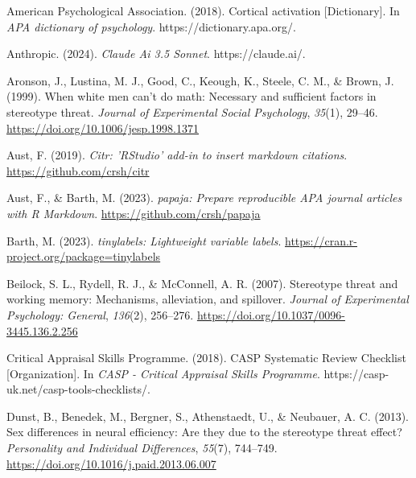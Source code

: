 \documentclass[
  stu]{apa7}
\newlength{\cslhangindent}
\newenvironment{CSLReferences}[2] %
 {\begin{list}{}{%
  \setlength{\itemindent}{0pt}
  \setlength{\leftmargin}{0pt}
  \setlength{\parsep}{0pt}
  \ifodd #1
   \setlength{\leftmargin}{\cslhangindent}
   \setlength{\itemindent}{-1\cslhangindent}
  \fi
  \setlength{\itemsep}{#2\baselineskip}}}
 {\end{list}}
\begin{document}
\label{refs}
\begin{CSLReferences}{1}{0}
American Psychological Association. (2018). Cortical activation {[}Dictionary{]}. In \emph{APA dictionary of psychology}. https://dictionary.apa.org/.

Anthropic. (2024). \emph{Claude {Ai} 3.5 {Sonnet}}. https://claude.ai/.

Aronson, J., Lustina, M. J., Good, C., Keough, K., Steele, C. M., \& Brown, J. (1999). When white men can't do math: {Necessary} and sufficient factors in stereotype threat. \emph{Journal of Experimental Social Psychology}, \emph{35}(1), 29--46. \url{https://doi.org/10.1006/jesp.1998.1371}

Aust, F. (2019). \emph{Citr: 'RStudio' add-in to insert markdown citations}. \url{https://github.com/crsh/citr}

Aust, F., \& Barth, M. (2023). \emph{{papaja}: {Prepare} reproducible {APA} journal articles with {R Markdown}}. \url{https://github.com/crsh/papaja}

Barth, M. (2023). \emph{{tinylabels}: Lightweight variable labels}. \url{https://cran.r-project.org/package=tinylabels}

Beilock, S. L., Rydell, R. J., \& McConnell, A. R. (2007). Stereotype threat and working memory: {Mechanisms}, alleviation, and spillover. \emph{Journal of Experimental Psychology: General}, \emph{136}(2), 256--276. \url{https://doi.org/10.1037/0096-3445.136.2.256}

Critical Appraisal Skills Programme. (2018). {CASP Systematic Review Checklist} {[}Organization{]}. In \emph{CASP - Critical Appraisal Skills Programme}. https://casp-uk.net/casp-tools-checklists/.

Dunst, B., Benedek, M., Bergner, S., Athenstaedt, U., \& Neubauer, A. C. (2013). Sex differences in neural efficiency: {Are} they due to the stereotype threat effect? \emph{Personality and Individual Differences}, \emph{55}(7), 744--749. \url{https://doi.org/10.1016/j.paid.2013.06.007}


\end{CSLReferences}
\end{document}
